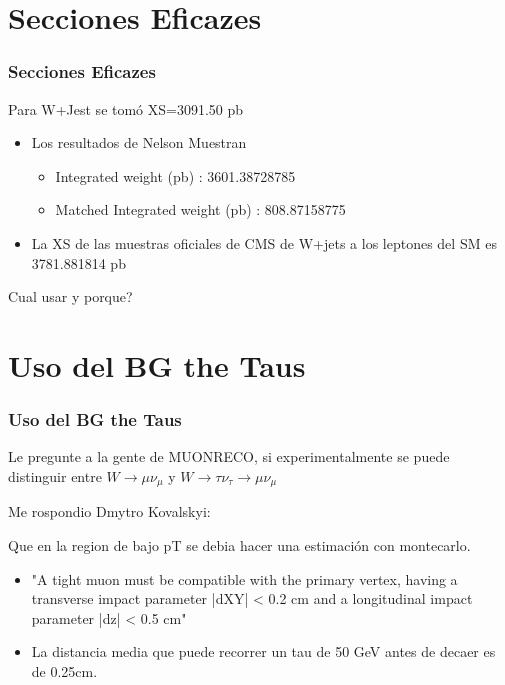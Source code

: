 \documentclass{beamer}
\numberwithin{figure}{section}
\begin{document}
\section{Secciones Eficazes}
\begin{frame}
\frametitle{Secciones Eficazes}

\begin{exampleblock}{Para W+Jest se tomó XS=3091.50 pb }
	\begin{itemize}
		\item Los resultados de Nelson Muestran 
		\begin{itemize}
			\item[]	Integrated weight (pb)          :  3601.38728785
			\item[] Matched Integrated weight (pb)  :  808.87158775
		\end{itemize} 					 
		\item La XS de las muestras oficiales de CMS de W+jets a los leptones del SM es 3781.881814 pb
	\end{itemize} 
	Cual usar y porque?
\end{exampleblock}

\end{frame}




\section{Uso del BG the Taus}
\begin{frame}
\frametitle{Uso del BG the Taus}
Le pregunte a la gente de MUONRECO, si experimentalmente se puede distinguir entre $W \rightarrow \mu \nu_{\mu}$ y $W \rightarrow \tau \nu_{\tau} \rightarrow \mu \nu_{\mu}$
\begin{exampleblock}{Me rospondio Dmytro Kovalskyi:}

Que en la region de bajo pT se debia hacer una estimación con montecarlo.

\end{exampleblock}

\begin{itemize}
	\item "A tight muon must be compatible with the primary vertex, having a transverse impact parameter |dXY| < 0.2 cm and a longitudinal impact parameter |dz| < 0.5 cm"
	\item La distancia media que puede recorrer un tau de 50 GeV antes de decaer es de 0.25cm.
	
\end{itemize}


\end{frame}
\end{document}
